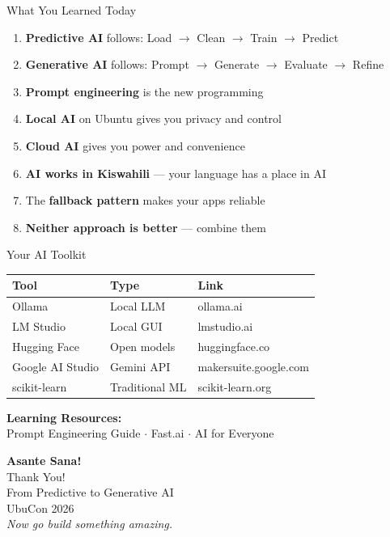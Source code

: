 \documentclass[aspectratio=169,12pt]{beamer}
\begin{document}
\begin{frame}{What You Learned Today}
\begin{enumerate}
\item \textcolor{predictblue}{\textbf{Predictive AI}} follows: Load $\rightarrow$ Clean $\rightarrow$ Train $\rightarrow$ Predict
\item \textcolor{gengreen}{\textbf{Generative AI}} follows: Prompt $\rightarrow$ Generate $\rightarrow$ Evaluate $\rightarrow$ Refine
\item \textbf{Prompt engineering} is the new programming
\item \textbf{Local AI} on Ubuntu gives you privacy and control
\item \textbf{Cloud AI} gives you power and convenience
\item \textbf{AI works in Kiswahili} --- your language has a place in AI
\item The \textbf{fallback pattern} makes your apps reliable
\item \textbf{Neither approach is better} --- combine them
\end{enumerate}
\end{frame}

\begin{frame}{Your AI Toolkit}
\begin{center}
{\small
\renewcommand{\arraystretch}{1.3}
\begin{tabular}{l l l}
\toprule
\textbf{Tool} & \textbf{Type} & \textbf{Link} \\
\midrule
Ollama & Local LLM & ollama.ai \\
LM Studio & Local GUI & lmstudio.ai \\
Hugging Face & Open models & huggingface.co \\
Google AI Studio & Gemini API & makersuite.google.com \\
scikit-learn & Traditional ML & scikit-learn.org \\
\bottomrule
\end{tabular}
}
\end{center}
\vspace{0.4cm}
\begin{center}
\textbf{Learning Resources:}\\
{\small Prompt Engineering Guide $\cdot$ Fast.ai $\cdot$ AI for Everyone}
\end{center}
\end{frame}

\begin{frame}[plain]
\begin{center}
\vspace{2cm}
{\Huge\textbf{Asante Sana!}}\\[0.5cm]
{\LARGE Thank You!}\\[1cm]
{\large From Predictive to Generative AI}\\[0.3cm]
{\large UbuCon 2026}\\[1.5cm]
{\normalsize\textit{Now go build something amazing.}}
\end{center}
\end{frame}
\end{document}
